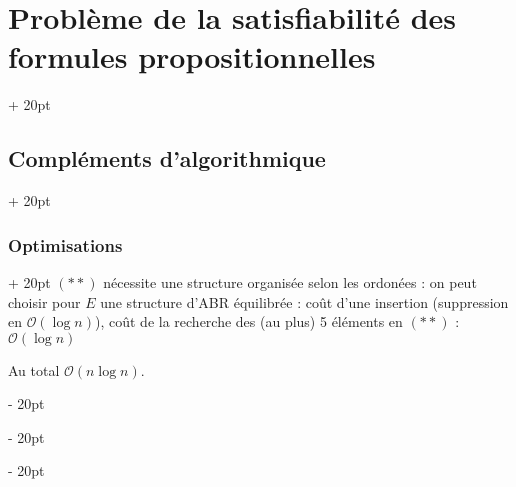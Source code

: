 \documentclass[a4paper, 12pt, twoside]{article}
\newcommand{\ind}[1][20pt]{\advance\leftskip + #1}
\newcommand{\deind}[1][20pt]{\advance\leftskip - #1}
\newenvironment{indt}[2][20pt]{#2 \par \ind[#1]}{\par \deind} %
\begin{document}
\begin{indt}{\section{Problème de la satisfiabilité des formules propositionnelles}}
\begin{indt}{\subsection{Compléments d'algorithmique}}
\begin{indt}{\subsubsection{Optimisations}}
                $(**)$ nécessite une structure organisée selon les ordonées : on peut choisir pour $E$ une structure d'ABR équilibrée : coût d'une insertion (suppression en $\mathcal O(\log n)$), coût de la recherche des (au plus) 5 éléments en $(**)$ : $\mathcal O(\log n)$ 
                
                Au total $\mathcal O(n \log n)$.
            \end{indt}
        \end{indt}
        
    \end{indt}
    
    
    
\end{document}
